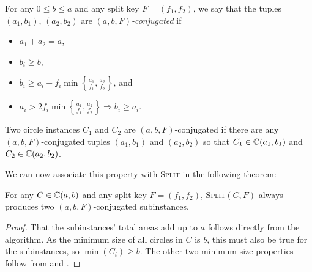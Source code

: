 \documentclass[a4paper,style=print,oneside,bibliography=totoc,nexus,lnum,extramargin]{tubsbook}
\begin{document}
\begin{definition}\label{def:conjugated}
    For any $0 \le b \le a$ and any split key $F = (f_1, f_2)$, we say that the tuples $(a_1, b_1)$, $(a_2, b_2)$ are \emph{$(a,b,F)$-conjugated} if

    \begin{itemize}
        \item $a_1 + a_2 = a$,
        \item $b_i \ge b$,
        \item $b_i \ge a_i - f_i \min\left\{\frac{a_1}{f_1}, \frac{a_2}{f_2}\right\}$, and
        \item $a_i > 2 f_i\min\left\{\frac{a_1}{f_1}, \frac{a_2}{f_2}\right\} \Rightarrow b_i \ge a_i$.
    \end{itemize}
\end{definition}

\begin{definition}
    Two circle instances $C_1$ and $C_2$ are $(a,b,F)$-conjugated if there are any $(a,b,F)$-conjugated tuples $(a_1, b_1)$ and $(a_2, b_2)$ so that $C_1 \in \mathbb{C}(a_1, b_1)$ and $C_2 \in \mathbb{C}(a_2, b_2)$.
\end{definition}

We can now associate this property with \textsc{Split} in the following theorem:

\begin{theorem}\label{th:split-properties}
    For any $C \in \mathbb{C}(a,b)$ and any split key $F = (f_1, f_2)$, \textsc{Split}$(C,F)$ always produces two $(a,b,F)$-conjugated subinstances.
\end{theorem}

\begin{proof}
    That the subinstances' total areas add up to $a$ follows directly from the algorithm.
    As the minimum size of all circles in $C$ is $b$, this must also be true for the subinstances, so $\min(C_i) \ge b$.
    The other two minimum-size properties follow from  and .
\end{proof}
\end{document}
